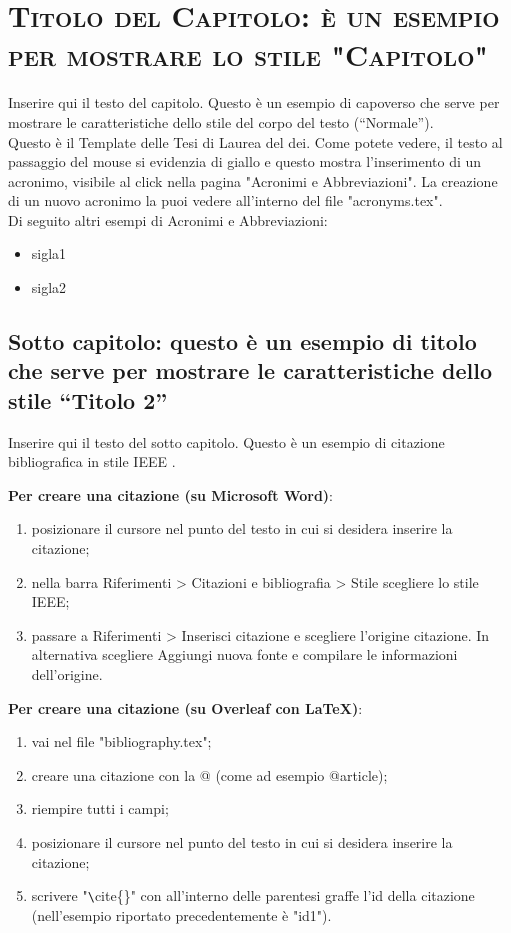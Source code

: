 \chapter{\scshape Titolo del Capitolo: è un esempio per mostrare lo stile "Capitolo"}

Inserire qui il testo del capitolo. Questo è un esempio di capoverso che serve per mostrare le caratteristiche dello stile del corpo del testo (“Normale”). \\

Questo è il Template delle Tesi di Laurea del \gls{dei}. Come potete vedere, il testo al passaggio del mouse si evidenzia di giallo e questo mostra l'inserimento di un acronimo, visibile al click nella pagina "Acronimi e Abbreviazioni". La creazione di un nuovo acronimo la puoi vedere all'interno del file "acronyms.tex". \\

Di seguito altri esempi di Acronimi e Abbreviazioni: \\
\begin{itemize}
    \item \gls{sigla1}
    \item \gls{sigla2}
\end{itemize}

\section{Sotto capitolo: questo è un esempio di titolo che serve per mostrare le caratteristiche dello stile “Titolo 2”}

Inserire qui il testo del sotto capitolo. Questo è un esempio di citazione bibliografica in stile IEEE \cite{id1}. 

\textbf{Per creare una citazione (su Microsoft Word)}:  
\begin{enumerate}
    \item posizionare il cursore nel punto del testo in cui si desidera inserire la citazione;
    \item nella barra Riferimenti > Citazioni e bibliografia > Stile scegliere lo stile IEEE;
    \item passare a Riferimenti > Inserisci citazione e scegliere l’origine citazione. In alternativa scegliere Aggiungi nuova fonte e compilare le informazioni dell'origine.
\end{enumerate} 

\textbf{Per creare una citazione (su Overleaf con LaTeX)}:
\begin{enumerate}
    \item vai nel file "bibliography.tex";
    \item creare una citazione con la @ (come ad esempio @article);
    \item riempire tutti i campi;
    \item posizionare il cursore nel punto del testo in cui si desidera inserire la citazione;
    \item scrivere "\verb|\|cite\{\}" con all'interno delle parentesi graffe l'id della citazione (nell'esempio riportato precedentemente è "id1").
\end{enumerate}



